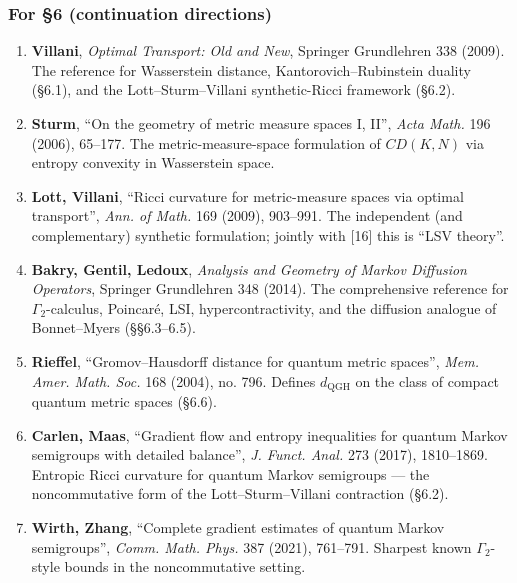 \documentclass[
  11pt,
]{article}
\providecommand{\tightlist}{%
  \setlength{\itemsep}{0pt}\setlength{\parskip}{0pt}}
\begin{document}
\subsubsection{For §6 (continuation
directions)}\label{for-6-continuation-directions}

\begin{enumerate}
\def\labelenumi{\arabic{enumi}.}
\setcounter{enumi}{14}
\tightlist
\item
  \textbf{Villani}, \emph{Optimal Transport: Old and New}, Springer
  Grundlehren 338 (2009). The reference for Wasserstein distance,
  Kantorovich--Rubinstein duality (§6.1), and the Lott--Sturm--Villani
  synthetic-Ricci framework (§6.2).
\item
  \textbf{Sturm}, ``On the geometry of metric measure spaces I, II'',
  \emph{Acta Math.} 196 (2006), 65--177. The metric-measure-space
  formulation of \(CD(K, N)\) via entropy convexity in Wasserstein
  space.
\item
  \textbf{Lott, Villani}, ``Ricci curvature for metric-measure spaces
  via optimal transport'', \emph{Ann. of Math.} 169 (2009), 903--991.
  The independent (and complementary) synthetic formulation; jointly
  with {[}16{]} this is ``LSV theory''.
\item
  \textbf{Bakry, Gentil, Ledoux}, \emph{Analysis and Geometry of Markov
  Diffusion Operators}, Springer Grundlehren 348 (2014). The
  comprehensive reference for \(\Gamma_2\)-calculus, Poincaré, LSI,
  hypercontractivity, and the diffusion analogue of Bonnet--Myers
  (§§6.3--6.5).
\item
  \textbf{Rieffel}, ``Gromov--Hausdorff distance for quantum metric
  spaces'', \emph{Mem. Amer. Math. Soc.} 168 (2004), no. 796. Defines
  \(d_{\mathrm{QGH}}\) on the class of compact quantum metric spaces
  (§6.6).
\item
  \textbf{Carlen, Maas}, ``Gradient flow and entropy inequalities for
  quantum Markov semigroups with detailed balance'', \emph{J. Funct.
  Anal.} 273 (2017), 1810--1869. Entropic Ricci curvature for quantum
  Markov semigroups --- the noncommutative form of the
  Lott--Sturm--Villani contraction (§6.2).
\item
  \textbf{Wirth, Zhang}, ``Complete gradient estimates of quantum Markov
  semigroups'', \emph{Comm. Math. Phys.} 387 (2021), 761--791. Sharpest
  known \(\Gamma_2\)-style bounds in the noncommutative setting.
\end{enumerate}
\end{document}
